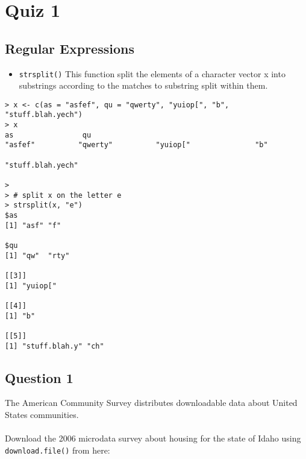\documentclass[]{article}
\begin{document}
\section*{Quiz 1}


\subsection*{Regular Expressions}
\begin{itemize}
\item \texttt{strsplit()} This function split the elements of a character vector x into 
substrings according to the matches to substring split within them.
\end{itemize}
\begin{verbatim}
> x <- c(as = "asfef", qu = "qwerty", "yuiop[", "b", "stuff.blah.yech")
> x
as                qu                                     
"asfef"          "qwerty"          "yuiop["               "b" 

"stuff.blah.yech" 

>
> # split x on the letter e
> strsplit(x, "e")
$as
[1] "asf" "f"  

$qu
[1] "qw"  "rty"

[[3]]
[1] "yuiop["

[[4]]
[1] "b"

[[5]]
[1] "stuff.blah.y" "ch"          

\end{verbatim}
\newpage
\subsection*{Question 1}
The American Community Survey distributes downloadable data about United States communities. \\ \\ Download the 2006 microdata survey about housing for the state of Idaho using \texttt{download.file()} from here: 
\end{document}

